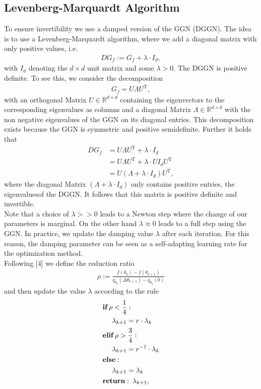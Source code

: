 \documentclass[conference]{IEEEtran}
\begin{document}
	\subsection{Levenberg-Marquardt Algorithm }
	\noindent
	To ensure invertibility we use a damped version of the GGN (DGGN). The idea is to use a Levenberg-Marquardt algorithm, where we add a diagonal matrix with only positive values, i.e.
	\begin{align}
	DG_{f} := G_{f} + \lambda\cdot I_{d},
	\end{align}
	with $I_{d}$ denoting the $d\times d$ unit matrix and some $\lambda>0$.
	The DGGN is positive definite.
	To see this, we consider the decomposition
	\begin{align}
	G_{f} = U\Lambda U^{\mathrm{T}},
	\end{align}
	with an orthogonal Matrix $U\in\mathbb{R}^{d\times d}$ containing the eigenvectors to the corresponding eigenvalues as columns and a diagonal Matrix $\Lambda\in\mathbb{R}^{d\times d}$ with the non negative eigenvalues of the GGN on its diagonal entries. This decomposition exists because the GGN is symmetric and positive semidefinite. Further it holds that
	\begin{align}
	DG_{f} &= U\Lambda U^{\mathrm{T}} + \lambda\cdot I_{d}\\
	&= U\Lambda U^{\mathrm{T}} + \lambda\cdot U I_{d}U^{\mathrm{T}}\\
	&= U\left(\Lambda + \lambda\cdot I_{d}\right)U^{\mathrm{T}},
	\end{align}
	where the diagonal Matrix $\left(\Lambda + \lambda\cdot I_{d}\right)$ only contains positive entries, the eigenvaluesof the DGGN. It follows that this matrix is positive definite and invertible.\\
	Note that a choice of $\lambda>>0$ leads to a Newton step where the change of our parameters is marginal. On the other hand $\lambda\approx 0$ leads to a full step using the GGN. In practice, we update the damping value $\lambda$ after each iteration. For this reason, the damping parameter can be seen as a self-adapting learning rate for the optimization method.\\
	Following [4] we define the reduction ratio
	\begin{align}
	\rho := \frac{f(\theta_{k}) - f(\theta_{k+1})}{q_{\theta_{k}}(\Delta\theta_{k + 1}) - q_{\theta_{k}}(0)}
	\end{align}
	and then update the value $\lambda$ according to the rule
	\begin{align}
	&\textbf{if}\:\rho<\frac{1}{4}:\notag\\
	&\text{ }\text{ }\text{ }\text{ }\lambda_{k+1} = r\cdot\lambda_{k}\notag\\
	&\textbf{elif}\:\rho>\frac{3}{4}:\notag\\
	&\text{ }\text{ }\text{ }\text{ }\lambda_{k + 1} = r^{-1}\cdot\lambda_{k}\notag\\
	&\textbf{else}: \notag\\
	&\text{ }\text{ }\text{ }\text{ }\lambda_{k + 1} = \lambda_{k}\notag\\
	&\textbf{return}:\:\lambda_{k + 1},
	\end{align}
\end{document}
